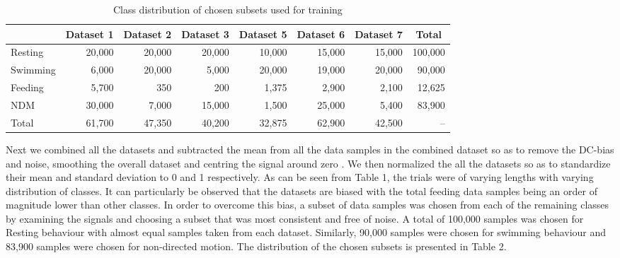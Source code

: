 \documentclass[conference]{IEEEtran}
\begin{document}
\begin{table}[tp!]
	\centering
	\caption{Class distribution of chosen subsets used for training}
	\begin{tabular}{l r r r r r r r}
	\hline
	& \textbf{Dataset 1} & \textbf{Dataset 2} & \textbf{Dataset 3} & \textbf{Dataset 5} & \textbf{Dataset 6} & \textbf{Dataset 7} & \multicolumn{1}{c}{\textbf{Total}}\\
	\hline
	Resting & 20,000 & 20,000 & 20,000 & 10,000 & 15,000 & 15,000 & 100,000 \\
	Swimming & 6,000 & 20,000 & 5,000 & 20,000 & 19,000 & 20,000 & 90,000 \\
	Feeding & 5,700 & 350 & 200 & 1,375 & 2,900 & 2,100 & 12,625 \\
	NDM & 30,000 & 7,000 & 15,000 & 1,500 & 25,000 & 5,400 & 83,900 \\
	Total & 61,700 & 47,350 & 40,200 & 32,875 & 62,900 & 42,500 & -- \\
	\hline
	\end{tabular}
	\label{}
\end{table}




Next we combined all the datasets and subtracted the mean from all the data samples in the combined dataset so as to remove the DC-bias and noise, smoothing the overall dataset and centring the signal around zero \cite{14}. We then normalized the all the datasets so as to standardize their mean and standard deviation to 0 and 1 respectively. 
As can be seen from Table 1, the trials were of varying lengths with varying distribution of classes. It can particularly be observed that the datasets are biased with the total feeding data samples being an order of magnitude lower than other classes. In order to overcome this bias, a subset of data samples was chosen from each of the remaining classes by examining the signals and choosing a subset that was most consistent and free of noise. A total of 100,000 samples was chosen for Resting behaviour with almost equal samples taken from each dataset. Similarly, 90,000 samples were chosen for swimming behaviour and 83,900 samples were chosen for non-directed motion. The distribution of the chosen subsets is presented in Table 2.

\end{document}
